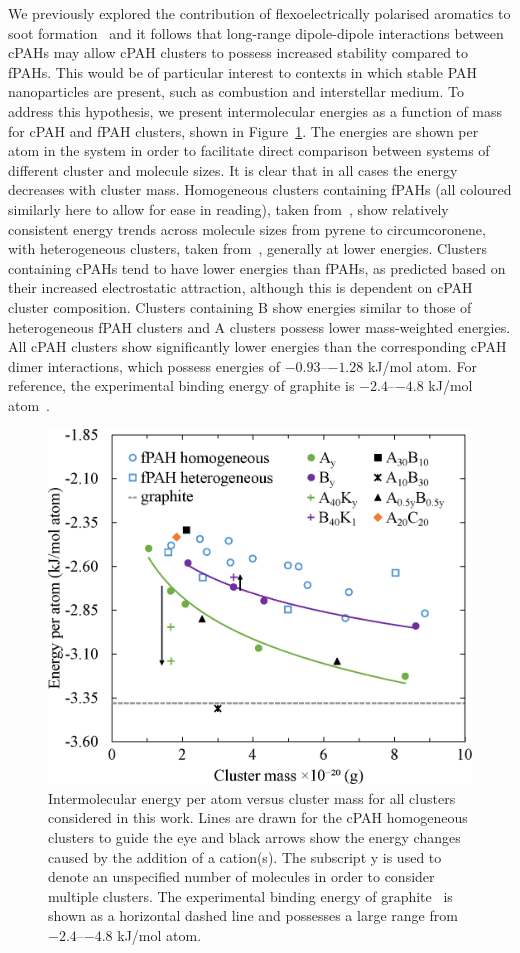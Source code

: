 We previously explored the contribution of flexoelectrically polarised aromatics to soot formation~\cite{Martin2018flexo} and it follows that long-range dipole-dipole interactions between cPAHs may allow cPAH clusters to possess increased stability compared to fPAHs.  This would be of particular interest to contexts in which stable PAH nanoparticles are present, such as combustion and interstellar medium.  To address this hypothesis, we present intermolecular energies as a function of mass for cPAH and fPAH clusters, shown in Figure~\ref{fig:energies}.  The energies are shown per atom in the system in order to facilitate direct comparison between systems of different cluster and molecule sizes. It is clear that in all cases the energy decreases with cluster mass. Homogeneous clusters containing fPAHs (all coloured similarly here to allow for ease in reading), taken from~\citet{chen2014size,chen2015solid}, show relatively consistent energy trends across molecule sizes from pyrene to circumcoronene, with heterogeneous clusters, taken from~\citet{bowal2018partitioning}, generally at lower energies. Clusters containing cPAHs tend to have lower energies than fPAHs, as predicted based on their increased electrostatic attraction, although this is dependent on cPAH cluster composition. Clusters containing B show energies similar to those of heterogeneous fPAH clusters and A clusters possess lower mass-weighted energies. All cPAH clusters show significantly lower energies than the corresponding cPAH dimer interactions, which possess energies of $-0.93$--$-1.28$ kJ/mol atom. For reference, the experimental binding energy of graphite is $-2.4$--$-4.8$ kJ/mol atom~\cite{benedict1998microscopic}.

%
\begin{figure}[!tbh]
\centering
\includegraphics[width=0.8\linewidth]{Figures/energies.eps}
\caption{Intermolecular energy per atom versus cluster mass for all clusters considered in this work. Lines are drawn for the cPAH homogeneous clusters to guide the eye and black arrows show the energy changes caused by the addition of a cation(s). The subscript y is used to denote an unspecified number of molecules in order to consider multiple clusters. The experimental binding energy of graphite~\cite{benedict1998microscopic} is shown as a horizontal dashed line and possesses a large range from $-2.4$--$-4.8$ kJ/mol atom.}
\label{fig:energies}
\end{figure}

